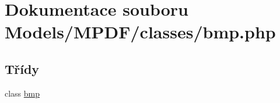\hypertarget{bmp_8php}{\section{Dokumentace souboru Models/\-M\-P\-D\-F/classes/bmp.php}
\label{bmp_8php}
}
\subsection*{Třídy}
\begin{DoxyCompactItemize}
\item 
class \hyperlink{classbmp}{bmp}
\end{DoxyCompactItemize}
